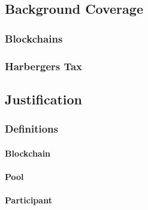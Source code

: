 \subsection{Background Coverage}


\subsubsection{Blockchains}






\subsubsection{Harbergers Tax}


\subsection{Justification} %



\subsubsection{Definitions}

\paragraph{Blockchain}


\paragraph{Pool}


\paragraph{Participant}

